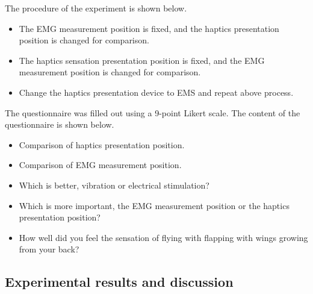 \documentclass[letterpaper, 10 pt, conference]{ieeeconf}  %
\begin{document}
                The procedure of the experiment is shown below.  
                \begin{itemize}
                        \item The EMG measurement position is fixed, and the haptics presentation position is changed for comparison.
                        \item The haptics sensation presentation position is fixed, and the EMG measurement position is changed for comparison.
                        \item Change the haptics presentation device to EMS and repeat above process.
                \end{itemize}

                The questionnaire was filled out using a 9-point Likert scale. The content of the questionnaire is shown below. 
                \begin{itemize}
                        \item Comparison of haptics presentation position. 
                        \item Comparison of EMG measurement position.
                        \item Which is better, vibration or electrical stimulation?
                        \item Which is more important, the EMG measurement position or the haptics presentation position?
                        \item How well did you feel the sensation of flying with flapping with wings growing from your back?
                \end{itemize}
                
        \subsection{Experimental results and discussion}


\end{document}
